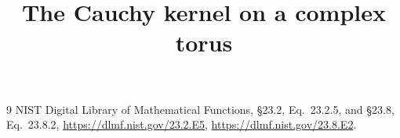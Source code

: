 \documentclass[11pt]{article}
\title{The Cauchy kernel on a complex torus}
\author{}
\date{}
\begin{document}
\maketitle

\begin{thebibliography}{9}
 NIST Digital Library of Mathematical Functions,
\S23.2, Eq.~23.2.5, and \S23.8, Eq.~23.8.2,
\url{https://dlmf.nist.gov/23.2.E5},
\url{https://dlmf.nist.gov/23.8.E2}.
\end{thebibliography}
\end{document}
